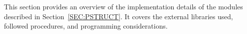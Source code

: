 This section provides an overview of the implementation details of the modules described in Section~\ref{SEC:PSTRUCT}. It covers the external libraries used, followed procedures, and programming considerations.